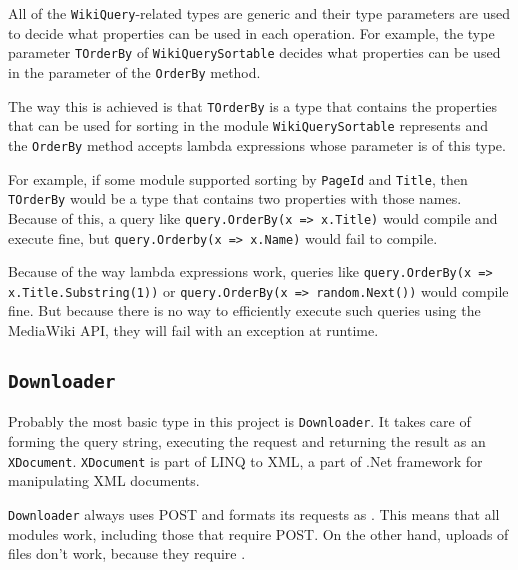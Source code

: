 \medskip


All of the \lstinline{WikiQuery}-related types are generic
and their type parameters are used to decide what properties can be used in each operation.
For example, the type parameter \lstinline{TOrderBy} of \lstinline{WikiQuerySortable}
decides what properties can be used in the parameter of the \lstinline{OrderBy} method.

The way this is achieved is that \lstinline{TOrderBy} is a type that contains the properties that can be
used for sorting in the module \lstinline{WikiQuerySortable} represents
and the \lstinline{OrderBy} method accepts lambda expressions whose parameter is of this type.

For example, if some module supported sorting by \lstinline{PageId} and \lstinline{Title},
then \lstinline{TOrderBy} would be a type that contains two properties with those names.
Because of this, a query like \lstinline{query.OrderBy(x => x.Title)} would compile and execute fine,
but \lstinline{query.Orderby(x => x.Name)} would fail to compile.

Because of the way lambda expressions work, queries like \lstinline[breaklines=true]{query.OrderBy(x => x.Title.Substring(1))} or \lstinline{query.OrderBy(x => random.Next())} would compile fine.
But because there is no way to efficiently execute such queries using the MediaWiki API,
they will fail with an exception at runtime.


\medskip


\subsection{\texorpdfstring{\lstinline{Downloader}}{Downloader}}

Probably the most basic type in this project is \lstinline{Downloader}.
It takes care of forming the query string, executing the request and
returning the result as an \lstinline{XDocument}.
\lstinline{XDocument} is part of LINQ to XML, a part of .Net framework for manipulating XML documents.

\lstinline{Downloader} always uses POST and formats its requests as .
This means that all modules work, including those that require POST.
On the other hand, uploads of files don't work, because they require .

